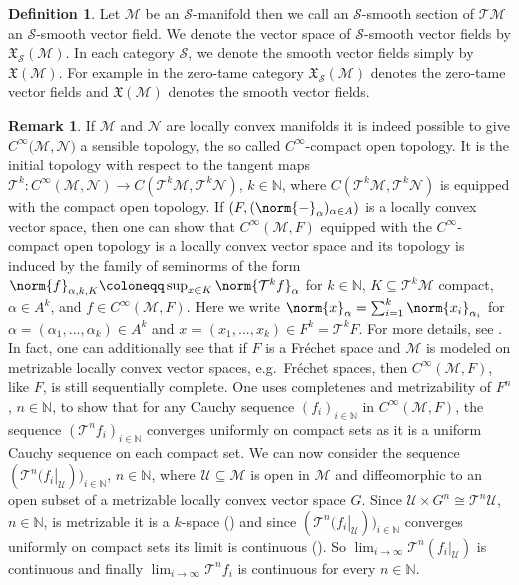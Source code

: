 \documentclass[12pt,a4paper]{article}
\theoremstyle{plain}
\theoremstyle{definition}
\newtheorem{definition}[theorem]{Definition}
\newtheorem{remark}[theorem]{Remark}
\newcommand{\N}{\mathbb{N}}
\newcommand{\nnorm}[2]{\norm{#1}_{#2}}
\newcommand{\Mcal}{\mathcal{M}}
\newcommand{\Ncal}{\mathcal{N}}
\newcommand{\Scal}{\mathcal{S}}
\newcommand{\Ucal}{\mathcal{U}}
\begin{document}
\begin{definition}
Let $\Mcal$ be an $\Scal$-manifold then we call an $\Scal$-smooth section of $\mathcal{TM}$ an $\Scal$-smooth vector field. We denote the vector space of $\Scal$-smooth vector fields by $\mathfrak{X}_\Scal(\Mcal)$. In each category $\Scal$, we denote the smooth vector fields simply by $\mathfrak{X}(\Mcal)$. For example in the zero-tame category $\mathfrak{X}_\Scal(\Mcal)$ denotes the zero-tame vector fields and $\mathfrak{X}(\Mcal)$ denotes the smooth vector fields.
\end{definition}

\begin{remark}
\label{Rem:MapsOfLocConvManifolds}
If $\mathcal{M}$ and $\mathcal{N}$ are locally convex manifolds it is indeed possible to give $C^\infty(\mathcal{M},\mathcal{N)}$ a sensible topology, the so called $C^\infty$-compact open topology. It is the initial topology with respect to the tangent maps $\mathcal{T}^k:C^\infty(\Mcal,\Ncal)\to C(\mathcal{T}^k\Mcal,\mathcal{T}^k\Ncal)$, $k\in \N$, where $C(\mathcal{T}^k\Mcal,\mathcal{T}^k\Ncal)$ is equipped with the compact open topology. 
If $(F,(\nnorm{-}{\alpha})_{\alpha\in A})$ is a locally convex vector space, then one can show that $C^\infty(\mathcal{M},F)$ equipped with the $C^\infty$-compact open topology is a locally convex vector space and its topology is induced by the family of seminorms of the form $\nnorm{f}{\alpha,k,K}\coloneqq \sup_{x\in K}\nnorm{\mathcal{T}^kf}{\alpha}$ for $k\in \N$, $K\subseteq \mathcal{T}^k \Mcal$ compact, $\alpha\in A^k$, and $f\in  C^\infty(\mathcal{M},F)$. Here we write $\nnorm{x}{\alpha}=\sum_{i=1}^k\nnorm{x_i}{\alpha_i}$ for
$\alpha=(\alpha_1,...,\alpha_k)\in A^k$ and $x=(x_1,...,x_k)\in F^k=\mathcal{T}^kF$. For more details, see \cite[Definition 2.1, Remark 2.2, and p.~208, B.6 and Lemma B.7]{schmeding_2022}.
In fact, one can additionally see that if $F$ is a Fréchet space and $\Mcal$ is modeled on metrizable locally convex vector spaces, e.g.~Fréchet spaces, then $C^\infty(\Mcal,F)$, like $F$, is still sequentially complete. One uses completenes and metrizability of $F^n$, $n\in \N$, to show that for any Cauchy sequence $(f_i)_{i\in \N}$ in $C^\infty(\Mcal,F)$, the sequence $(\mathcal{T}^nf_i)_{i\in \N}$ converges uniformly on compact sets as it is a uniform Cauchy sequence on each compact set. 
We can now consider the sequence $(\left.\mathcal T^n(f_i\right|_\Ucal))_{i\in \N}$, $n\in \N$, where $\Ucal\subseteq \Mcal$ is open in $\Mcal$ and diffeomorphic to an open subset of a metrizable locally convex vector space $G$. Since $\Ucal\times G^n\cong \mathcal{T}^n\Ucal$, $n\in \N$, is metrizable it is a $k$-space (\cite[§7, p.~231, Theorem 13]{Kelley}) and since $(\left.\mathcal T^n(f_i\right|_\Ucal))_{i\in \N}$ converges uniformly on compact sets its limit is continuous (\cite[§7, p.~231, Theorem 12]{Kelley}). So $\lim_{i\to \infty}\mathcal{T}^n(\left.f_i\right|_\Ucal)$ is continuous and finally $\lim_{i\to \infty}\mathcal{T}^nf_i$ is continuous for every $n\in \N$. 

\end{remark}
\end{document}
